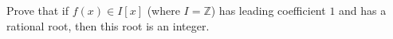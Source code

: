 Prove that if $f(x) \in I[x]$ (where $I = \mathbb{Z}$) has leading coefficient $1$ and has a rational root, then this root is an integer.